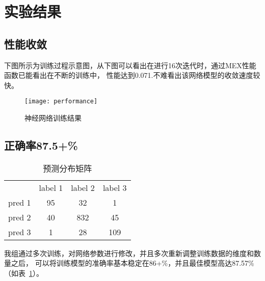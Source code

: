 \section{实验结果}

\subsection{性能收敛}

下图所示为训练过程示意图，从下图可以看出在进行16次迭代时，通过MEX性能函数已能看出在不断的训练中，
性能达到0.071.不难看出该网络模型的收敛速度较快。

\begin{figure}[ht]
	\centering
	\texttt{[image: performance]}
	\caption{神经网络训练结果}
	\label{fig:performance}
\end{figure}

\subsection{正确率87.5+\%}

\begin{table}[ht]
	\centering
	\caption{预测分布矩阵}
	\label{tab:eva}
	\begin{tabular}{cccc}
		& label 1 & label 2 & label 3 \\
		pred 1 & 95      & 32      & 1       \\
		pred 2 & 40      & 832     & 45      \\
		pred 3 & 1       & 28      & 109    
	\end{tabular}
\end{table}

我组通过多次训练，对网络参数进行修改，并且多次重新调整训练数据的维度和数量之后，
可以将训练模型的准确率基本稳定在86+\%，并且最佳模型高达87.57\%（如表~\ref{tab:eva}）。